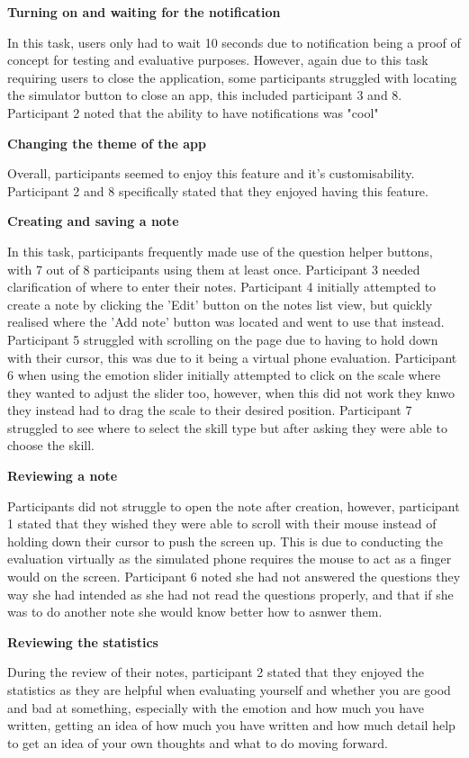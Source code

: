 \documentclass{l4proj}
\begin{document}
\textbf{Turning on and waiting for the notification}

In this task, users only had to wait 10 seconds due to notification being a proof of concept for testing and evaluative purposes. However, again due to this task requiring users to close the application, some participants struggled with locating the simulator button to close an app, this included participant 3 and 8. Participant 2 noted that the ability to have notifications was "cool"

\textbf{Changing the theme of the app}

Overall, participants seemed to enjoy this feature and it's customisability. Participant 2 and 8 specifically stated that they enjoyed having this feature.

\textbf{Creating and saving a note}

In this task, participants frequently made use of the question helper buttons, with 7 out of 8 participants using them at least once. Participant 3 needed clarification of where to enter their notes. Participant 4 initially attempted to create a note by clicking the 'Edit' button on the notes list view, but quickly realised where the 'Add note' button was located and went to use that instead. Participant 5 struggled with scrolling on the page due to having to hold down with their cursor, this was due to it being a virtual phone evaluation. Participant 6 when using the emotion slider initially attempted to click on the scale where they wanted to adjust the slider too, however, when this did not work they knwo they instead had to drag the scale to their desired position. Participant 7 struggled to see where to select the skill type but after asking they were able to choose the skill.

\textbf{Reviewing a note}

Participants did not struggle to open the note after creation, however, participant 1 stated that they wished they were able to scroll with their mouse instead of holding down their cursor to push the screen up. This is due to conducting the evaluation virtually as the simulated phone requires the mouse to act as a finger would on the screen. Participant 6 noted she had not answered the questions they way she had intended as she had not read the questions properly, and that if she was to do another note she would know better how to asnwer them.

\textbf{Reviewing the statistics}

During the review of their notes, participant 2 stated that they enjoyed the statistics as they are helpful when evaluating yourself and whether you are good and bad at something, especially with the emotion and how much you have written, getting an idea of how much you have written and how much detail help to get an idea of your own thoughts and what to do moving forward.
\end{document}
